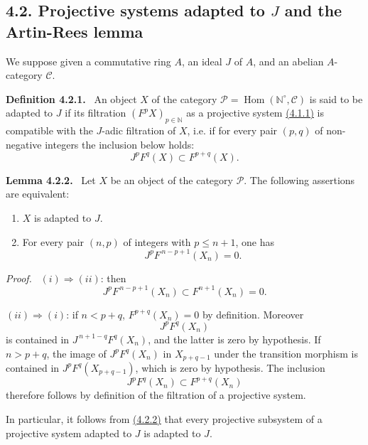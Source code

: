 \documentclass[11pt]{article}
\newenvironment{statement}[1]{\par\medskip\noindent\textbf{#1.}\ }{\par\medskip}
\newenvironment{prooftext}[1][Proof]{\par\noindent\emph{#1.}\ }{\par\medskip}
\DeclareMathOperator{\Hom}{Hom}
\providecommand{\Hom}{\operatorname{Hom}}
\providecommand{\Hom}{\operatorname{Hom}}
\begin{document}
\subsection*{4.2. Projective systems adapted to \(J\) and the Artin-Rees lemma}\label{sga5:V:subsection:4.2}

We suppose given a commutative ring \(A\), an ideal \(J\) of \(A\), and an abelian \(A\)-category \(\mathcal C\).

\label{sga5:V:definition:4.2.1}\begin{statement}{Definition 4.2.1}
An object \(X\) of the category \(\mathcal P=\Hom(\mathbb N^\circ,\mathcal C)\) is said to be adapted to \(J\) if its filtration \((F^pX)_{p\in\mathbb N}\) as a projective system \hyperref[sga5:V:subsubsection:4.1.1]{(4.1.1)} is compatible with the \(J\)-adic filtration of \(X\), i.e. if for every pair \((p,q)\) of non-negative integers the inclusion below holds:
\[
J^pF^q(X)\subset F^{p+q}(X).
\]
\end{statement}

\label{sga5:V:lemma:4.2.2}\begin{statement}{Lemma 4.2.2}
Let \(X\) be an object of the category \(\mathcal P\). The following assertions are equivalent:
\begin{enumerate}[label=\textup{(\roman*)}]
\item \(X\) is adapted to \(J\).
\item For every pair \((n,p)\) of integers with \(p\le n+1\), one has
\[
J^pF^{\,n-p+1}(X_n)=0 .
\]
\end{enumerate}
\end{statement}

\begin{prooftext}
\((i)\Rightarrow(ii)\): then
\[
J^pF^{\,n-p+1}(X_n)\subset F^{n+1}(X_n)=0.
\]

\((ii)\Rightarrow(i)\): if \(n<p+q\), \(F^{p+q}(X_n)=0\) by definition. Moreover
\[
J^pF^q(X_n)
\]
is contained in \(J^{\,n+1-q}F^q(X_n)\), and the latter is zero by hypothesis. If \(n>p+q\), the image of \(J^pF^q(X_n)\) in \(X_{p+q-1}\) under the transition morphism is contained in \(J^pF^q(X_{p+q-1})\), which is zero by hypothesis. The inclusion
\[
J^pF^q(X_n)\subset F^{p+q}(X_n)
\]
therefore follows by definition of the filtration of a projective system.

In particular, it follows from \hyperref[sga5:V:lemma:4.2.2]{(4.2.2)} that every projective subsystem of a projective system adapted to \(J\) is adapted to \(J\).
\end{prooftext}
\end{document}
